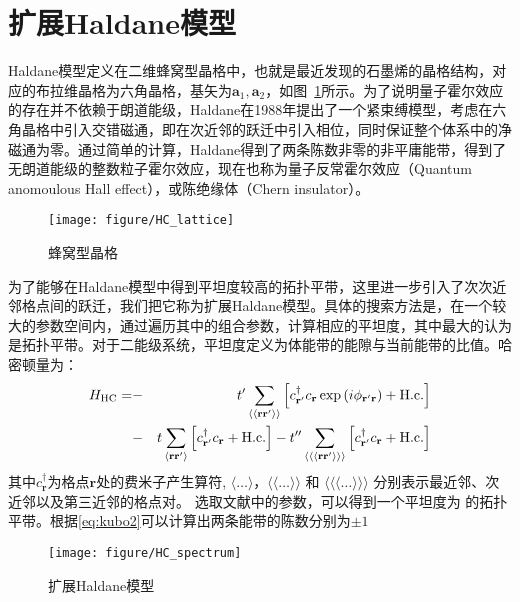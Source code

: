 \section{扩展Haldane模型}
Haldane模型定义在二维蜂窝型晶格中，也就是最近发现的石墨烯的晶格结构，对应的布拉维晶格为六角晶格，基矢为$\textbf{a}_1,\textbf{a}_2$，如图~\ref{fig:HClattice}所示。为了说明量子霍尔效应的存在并不依赖于朗道能级，Haldane在1988年提出了一个紧束缚模型，考虑在六角晶格中引入交错磁通，即在次近邻的跃迁中引入相位，同时保证整个体系中的净磁通为零。通过简单的计算，Haldane得到了两条陈数非零的非平庸能带，得到了无朗道能级的整数粒子霍尔效应，现在也称为量子反常霍尔效应（Quantum anomoulous Hall effect），或陈绝缘体（Chern insulator）。

\begin{figure}
 \centering
 \texttt{[image: figure/HC\_lattice]}
 \caption{蜂窝型晶格}
 \label{fig:HClattice}
\end{figure}

为了能够在Haldane模型中得到平坦度较高的拓扑平带，这里进一步引入了次次近邻格点间的跃迁，我们把它称为扩展Haldane模型。具体的搜索方法是，在一个较大的参数空间内，通过遍历其中的组合参数，计算相应的平坦度，其中最大的认为是拓扑平带。对于二能级系统，平坦度定义为体能带的能隙与当前能带的比值。哈密顿量为：
\begin{eqnarray}
H_{\rm HC}= &-&t^{\prime}\sum_{\langle\langle\mathbf{r}\mathbf{r}^{
\prime}\rangle\rangle}
\left[c^{\dagger}_{\mathbf{r}^{ \prime}}c_{\mathbf{r}}\exp\left(i\phi_{\mathbf{r}^{ \prime}\mathbf{r}}\right)+\textrm{H.c.}\right]\\
&-&t\sum_{\langle\mathbf{r}\mathbf{r}^{ \prime}\rangle}
\left[c^{\dagger}_{\mathbf{r}^{\prime}}c_{\mathbf{r}}+\textrm{H.c.}\right]
-t^{\prime\prime}\sum_{\langle\langle\langle\mathbf{r}\mathbf{r}^{
\prime}\rangle\rangle\rangle}
\left[c^{\dagger}_{\mathbf{r}^{\prime}}c_{\mathbf{r}}+\textrm{H.c.}\right]\nonumber
\label{eq:hc}
\end{eqnarray}
其中$c^{\dagger}_{\mathbf{r}}$为格点$\mathbf{r}$处的费米子产生算符,  $\langle\dots\rangle$，$\langle\langle\dots\rangle\rangle$ 和 $\langle\langle\langle\dots\rangle\rangle\rangle$ 分别表示最近邻、次近邻以及第三近邻的格点对。
选取\cite{}文献中的参数，可以得到一个平坦度为 的拓扑平带。根据\ref{eq:kubo2}可以计算出两条能带的陈数分别为$\pm1$

\begin{figure}[h]
  \centering
  \texttt{[image: figure/HC\_spectrum]}
\caption{扩展Haldane模型}
\label{fig:hc_spectrum}
\end{figure}


